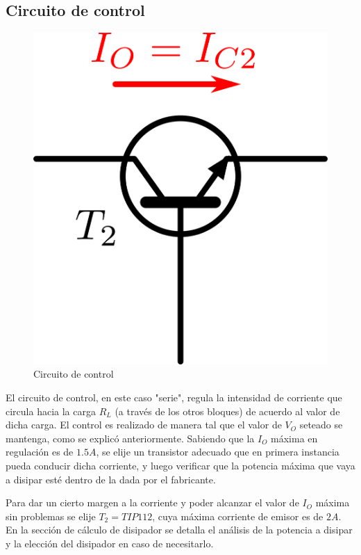 \subsection{Circuito de control}

\begin{figure}[!h]
\begin{centering}
\includegraphics[scale=0.5]{Imagenes/Control.png}
\par\end{centering}
\caption{Circuito de control}

\end{figure}

El circuito de control, en este caso "serie", regula la intensidad de corriente que circula hacia la carga $R_L$ (a trav\'es de los otros bloques) de acuerdo al valor de dicha carga. El control es realizado de manera tal que el valor de $V_O$ seteado se mantenga, como se explic\'o anteriormente.
Sabiendo que la $I_O$ m\'axima en regulaci\'on es de $1.5A$, se elije un transistor adecuado que en primera instancia pueda conducir dicha corriente, y luego verificar que la potencia m\'axima que vaya a disipar est\'e dentro de la dada por el fabricante.\par
Para dar un cierto margen a la corriente y poder alcanzar el valor de $I_O$ m\'axima sin problemas se elije $T_2 = TIP112$, cuya m\'axima corriente de emisor es de $2A$.
En la secci\'on de c\'alculo de disipador se detalla el an\'alisis de la potencia a disipar y la elecci\'on del disipador en caso de necesitarlo.

